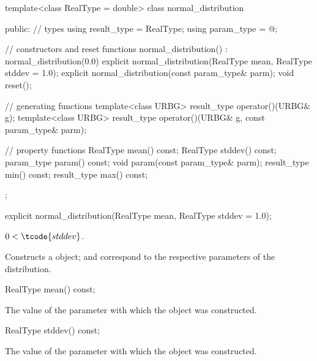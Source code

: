 %
\begin{codeblock}
template<class RealType = double>
  class normal_distribution {
  public:
    // types
    using result_type = RealType;
    using param_type  = @\unspec@;

    // constructors and reset functions
    normal_distribution() : normal_distribution(0.0) {}
    explicit normal_distribution(RealType mean, RealType stddev = 1.0);
    explicit normal_distribution(const param_type& parm);
    void reset();

    // generating functions
    template<class URBG>
      result_type operator()(URBG& g);
    template<class URBG>
      result_type operator()(URBG& g, const param_type& parm);

    // property functions
    RealType mean() const;
    RealType stddev() const;
    param_type param() const;
    void param(const param_type& parm);
    result_type min() const;
    result_type max() const;
  };
\end{codeblock}


%
\begin{itemdecl}
explicit normal_distribution(RealType mean, RealType stddev = 1.0);
\end{itemdecl}

\begin{itemdescr}
\pnum
\requires $0 < \tcode{stddev}$.

\pnum
\effects Constructs a  object;
 and 
correspond to the respective parameters of the distribution.
\end{itemdescr}

%
\begin{itemdecl}
RealType mean() const;
\end{itemdecl}

\begin{itemdescr}
\pnum\returns The value of the  parameter
 with which the object was constructed.
\end{itemdescr}

%
\begin{itemdecl}
RealType stddev() const;
\end{itemdecl}

\begin{itemdescr}
\pnum\returns The value of the  parameter
 with which the object was constructed.
\end{itemdescr}

